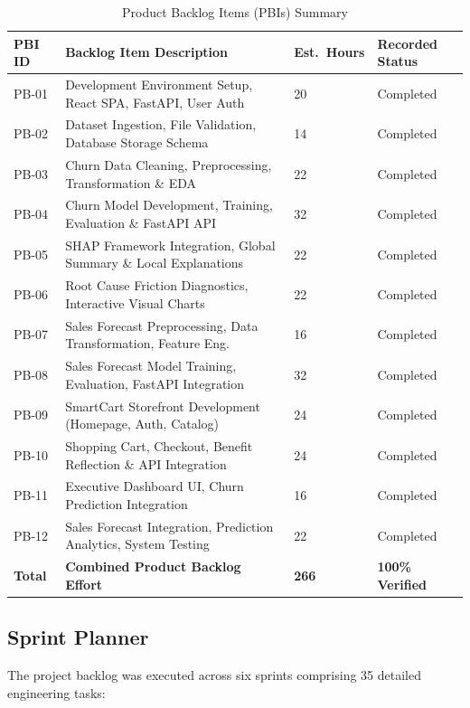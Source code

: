 \documentclass[12pt,a4paper]{article}
\begin{document}
\begin{table}[H]
\centering
\small
\caption{Product Backlog Items (PBIs) Summary}
\begin{tabularx}{\linewidth}{|C{1.8cm}|Y|C{2.2cm}|C{2.5cm}|}
\hline
\textbf{PBI ID} & \textbf{Backlog Item Description} & \textbf{Est.\ Hours} & \textbf{Recorded Status} \\ \hline
PB-01 & Development Environment Setup, React SPA, FastAPI, User Auth & 20 & Completed \\ \hline
PB-02 & Dataset Ingestion, File Validation, Database Storage Schema & 14 & Completed \\ \hline
PB-03 & Churn Data Cleaning, Preprocessing, Transformation \& EDA & 22 & Completed \\ \hline
PB-04 & Churn Model Development, Training, Evaluation \& FastAPI API & 32 & Completed \\ \hline
PB-05 & SHAP Framework Integration, Global Summary \& Local Explanations & 22 & Completed \\ \hline
PB-06 & Root Cause Friction Diagnostics, Interactive Visual Charts & 22 & Completed \\ \hline
PB-07 & Sales Forecast Preprocessing, Data Transformation, Feature Eng. & 16 & Completed \\ \hline
PB-08 & Sales Forecast Model Training, Evaluation, FastAPI Integration & 32 & Completed \\ \hline
PB-09 & SmartCart Storefront Development (Homepage, Auth, Catalog) & 24 & Completed \\ \hline
PB-10 & Shopping Cart, Checkout, Benefit Reflection \& API Integration & 24 & Completed \\ \hline
PB-11 & Executive Dashboard UI, Churn Prediction Integration & 16 & Completed \\ \hline
PB-12 & Sales Forecast Integration, Prediction Analytics, System Testing & 22 & Completed \\ \hline
\textbf{Total} & \textbf{Combined Product Backlog Effort} & \textbf{266} & \textbf{100\% Verified} \\ \hline
\end{tabularx}
\label{tab:pbi_summary}
\end{table}

\subsection{Sprint Planner}\label{sub:4.4}

The project backlog was executed across six sprints comprising 35 detailed engineering tasks:
\end{document}
